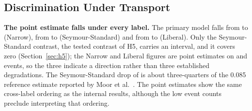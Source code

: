 \subsection{Discrimination Under Transport}

\begin{table}[H]
    \centering
    \caption{External validation on eICU-CRD (frozen models, no retraining),
    Sepsis-3 anchor on the microbiology-covered sub-cohort. Each variant
    carries its own external label set, so the row counts and event counts
    differ across variants as they do internally.}
    \label{tab:external}
\end{table}

\textbf{The point estimate falls under every label.} The primary
model falls from \pcAurocPrimaryA{} to \pcExtAurocPrimaryA{} (Narrow), from
\pcAurocPrimaryB{} to \pcExtAurocPrimaryB{} (Seymour-Standard) and from
\pcAurocPrimaryC{} to \pcExtAurocPrimaryC{} (Liberal). Only the
Seymour-Standard contrast, the tested contrast of H5, carries an interval, and
it covers zero (Section~\ref{sec:h5}); the Narrow and Liberal figures are point
estimates on \pcExtNEventsA{} and \pcExtNEventsC{} events, so the three
indicate a direction rather than three established degradations. The
Seymour-Standard drop of \pcHFiveEst{} is about three-quarters of the 0.085
reference estimate reported by Moor et al.\ \cite{moor2023review}. The point
estimates show the same cross-label ordering as the internal results, although
the low event counts preclude interpreting that ordering.

